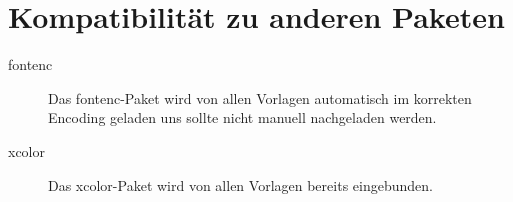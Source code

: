 
\section{Kompatibilität zu anderen Paketen}

\begin{description}
  \item[fontenc]
    Das fontenc-Paket wird von allen Vorlagen automatisch im korrekten Encoding
    geladen uns sollte nicht manuell nachgeladen werden.
  \item[xcolor]
    Das xcolor-Paket wird von allen Vorlagen bereits eingebunden.
\end{description}
